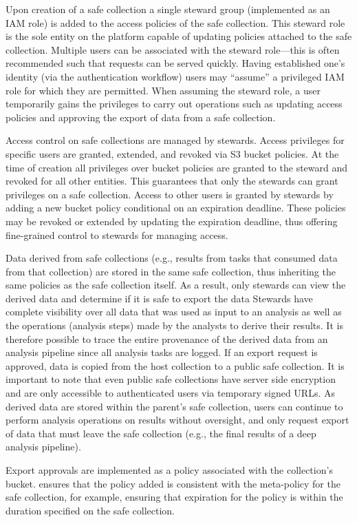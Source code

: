 Upon creation of a safe collection a single steward group (implemented as an IAM role) is added to the
access policies of the safe collection. This steward role is the sole entity on the platform capable of
updating policies attached to the safe collection.
Multiple users can be associated with the steward role---this is often recommended such 
that requests can be served quickly. 
Having established one's identity (via the \NAME authentication workflow) users 
may ``assume'' a privileged IAM role for which they are permitted. 
When assuming the steward role, a user temporarily gains the privileges to carry out operations such
as updating access policies and approving the export of data from a safe collection.

Access control on safe collections are managed by stewards. Access privileges for specific users
are granted, extended, and revoked via S3 bucket policies. At the time of creation all
privileges over bucket policies are granted to the steward and revoked for all other entities. This
guarantees that only the stewards can grant privileges on a safe collection. Access to other users 
is granted by stewards by adding a new bucket policy conditional on an expiration deadline. These policies may be revoked or
extended by updating the expiration deadline, thus offering fine-grained control to stewards for managing
access.

Data derived from safe collections (e.g., results from tasks that consumed data from that collection)
are stored in the same safe collection, thus inheriting the same policies as the safe collection itself.
As a result, only stewards can view the derived data and determine if it is safe to 
export the data
Stewards have complete visibility over all data that was used as input to an analysis as
well as the operations (analysis steps) made by the analysts to derive their results.
It is therefore possible to trace the entire provenance of the derived data from an
analysis pipeline since all analysis tasks are logged.
If an export request is approved, data is copied from the host collection to a public safe collection. 
It is important to note that even public safe collections have server side encryption and 
are only accessible to authenticated users via temporary signed URLs. 
As derived data are stored within the parent's safe collection, users can continue 
to perform analysis operations on results without oversight,
and only request export of data that must leave the safe collection (e.g., the
final results of a deep analysis pipeline).

Export approvals are implemented as a policy associated with the collection's bucket. 
\NAME ensures that the policy added is consistent with the meta-policy for the safe collection, 
for example, ensuring that expiration for the policy
is within the duration specified on the safe collection.





